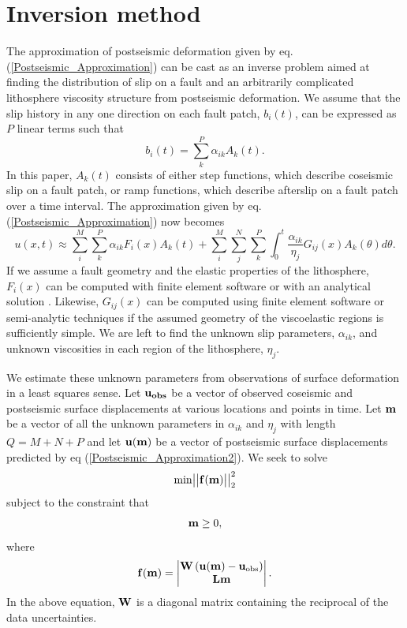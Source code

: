 \documentclass[fleqn,12pt]{article}
\begin{document}
\section{Inversion method}
The approximation of postseismic deformation given by eq.
(\ref{Postseismic_Approximation}) can be cast as an inverse problem
aimed at finding the distribution of slip on a fault and an
arbitrarily complicated lithosphere viscosity structure from
postseismic deformation. We assume that the slip history in any one
direction on each fault patch, $b_i(t)$, can be expressed as $P$ linear
terms such that
\begin{equation}
  b_i(t) = \sum_k^P \alpha_{ik}A_k(t).
\end{equation}
In this paper, $A_k(t)$ consists of either step functions, which
describe coseismic slip on a fault patch, or ramp functions, which
describe afterslip on a fault patch over a time interval.  The
approximation given by eq. (\ref{Postseismic_Approximation}) now
becomes
\begin{equation}\label{Postseismic_Approximation2}
u(x,t) \approx \sum_i^M\sum_k^P\alpha_{ik}F_i(x)A_k(t) + 
               \sum_i^M\sum_j^N\sum_k^P\int_0^t\frac{\alpha_{ik}}{\eta_j}G_{ij}(x)A_k(\theta)d\theta.
\end{equation}
If we assume a fault geometry and the elastic properties of the
lithosphere, $F_i(x)$ can be computed with finite element software or
with an analytical solution \citep[e.g.][]{O1992,M2007}. Likewise,
$G_{ij}(x)$ can be computed using finite element software or
semi-analytic techniques \citep[e.g.][]{P1997,BF2010,FM2006} if the
assumed geometry of the viscoelastic regions is sufficiently simple.
We are left to find the unknown slip parameters, $\alpha_{ik}$, and
unknown viscosities in each region of the lithosphere, $\eta_j$.

We estimate these unknown parameters from observations of surface
deformation in a least squares sense. Let $\bold{u_{obs}}$ be a vector of
observed coseismic and postseismic surface displacements at various
locations and points in time.  Let $\bold{m}$ be a vector of all the
unknown parameters in $\alpha_{ik}$ and $\eta_j$ with length $Q=M+N+P$
and let $\bold{u(m)}$ be a vector of postseismic surface displacements
predicted by eq (\ref{Postseismic_Approximation2}). We seek to solve
\begin{equation}\label{Inverse_Problem}
  \mathrm{min}
  \big|\big|\bold{f(m)}\big|\big|_2^2
\end{equation}
subject to the constraint that
\begin{equation}
  \bold{m}\geq0,
\end{equation}
where 
\begin{equation}
  \bold{f(m)} = 
    \begin{vmatrix}
      \bold{W}\left(\bold{u(m)}-\bold{u}_{\mathrm{obs}}\right)\\
      \bold{Lm}\\
    \end{vmatrix} .
\end{equation}  
In the above equation, $\bold{W}$ is a diagonal matrix containing the
reciprocal of the data uncertainties. 
\end{document}
